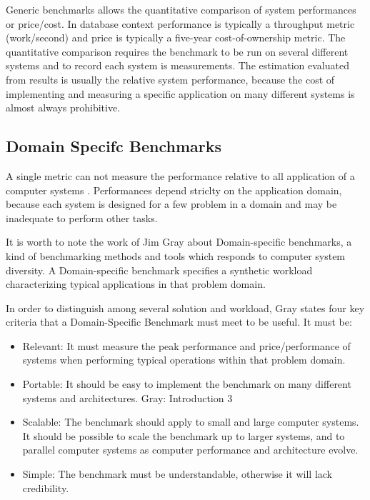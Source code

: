Generic benchmarks allows the quantitative comparison of system performances or price/cost. In database context performance is typically a throughput metric (work/second) and price is typically a five-year cost-of-ownership metric. The quantitative comparison requires the benchmark to be run on several different systems and to record each system is measurements.  The estimation evaluated from results is usually the relative system performance, because the cost of implementing and measuring a specific application on many different systems is almost always prohibitive.

\subsection{Domain Specifc Benchmarks}  \label{sec:tcp}

A single metric can not measure the performance relative to all application of a computer systems \cite{DBLP:books/mk/Gray93}. Performances depend striclty on the application domain, because each system is designed for a few problem in a domain and may be inadequate to perform other tasks.

It is worth to note the work of Jim Gray about Domain-specific benchmarks, a kind of benchmarking methods and tools  which responds to computer system diversity. A Domain-specific benchmark specifies a synthetic workload characterizing typical applications in that problem domain. 

In order to distinguish among several solution and workload, Gray states four key criteria that a Domain-Specific Benchmark must meet to be useful\cite{DBLP:books/mk/Gray93}. It must be:
\begin{itemize}
\item Relevant: It must measure the peak performance and price/performance of systems when performing typical operations within that problem domain.
\item Portable: It should be easy to implement the benchmark on many different systems and architectures.
Gray: Introduction 3
\item Scalable: The benchmark should apply to small and large computer systems. It should be possible to scale the benchmark up to larger systems, and to parallel computer systems as computer performance and architecture evolve.
\item Simple: The benchmark must be understandable, otherwise it will lack credibility.
\end{itemize} 


